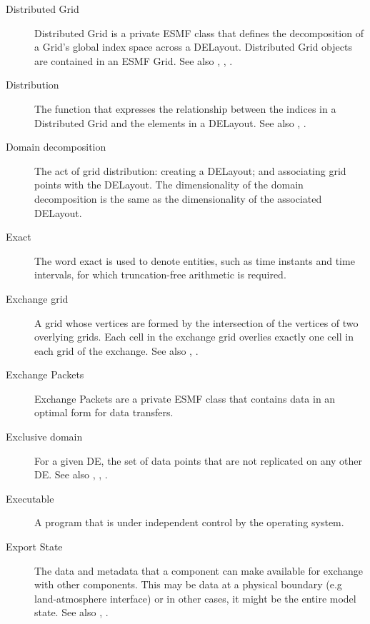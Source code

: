 \begin{description}
\label{glos:DistGrid}
\item[Distributed Grid]
  Distributed Grid is a private ESMF class that defines the 
  decomposition of a Grid's global index space across a DELayout.
  Distributed Grid objects are contained in an ESMF Grid. 
  See also , ,
  .

\label{glos:Distribution}
\item[Distribution] The function that expresses
  the relationship between the indices in a Distributed Grid and the elements 
  in a DELayout. See also , 
  . 

\label{glos:DomainDecomp}
\item[Domain decomposition] The act of grid 
  distribution: creating a DELayout; and associating grid points with 
  the DELayout.  The dimensionality of the domain decomposition is the 
  same as the dimensionality of the associated DELayout.

\label{glos:Exact}
\item [Exact] The word exact is used
  to denote entities, such as time instants and time intervals, for 
  which truncation-free arithmetic is required. 

\label{glos:ExchangeGrid}
\item[Exchange grid] A grid whose vertices are
  formed by the intersection of the vertices of two overlying grids.  Each 
  cell in the exchange grid overlies exactly one cell in each grid of the 
  exchange. See also , .

\label{glos:EP}
\item[Exchange Packets] Exchange Packets are a private
  ESMF class that contains data in an optimal form for data transfers.

\label{glos:ExcDomain}
\item[Exclusive domain] For a given DE, the 
  set of data points that are not replicated on any other DE.  See also 
  ,
  , .

\label{glos:Exec} 
\item[Executable] 
  A program that is under independent control by the operating 
  system.

\label{glos:ExportState} 
\item[Export State] 
  The data and metadata that 
  a component can make available for exchange with other components. 
  This may be data at a physical boundary (e.g land-atmosphere interface) 
  or in other cases, it might be the entire model state.  
  See also , .


\end{description}

